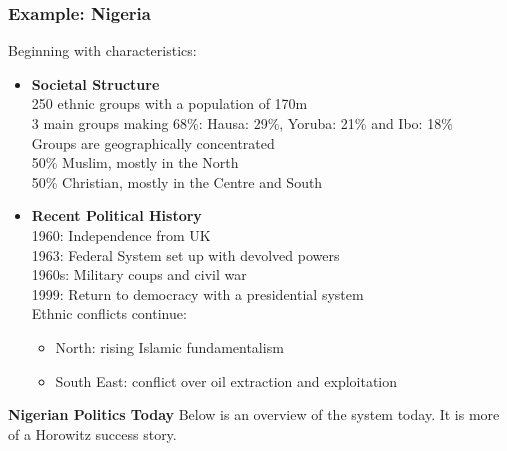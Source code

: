 \documentclass[12pt, letterpaper]{article}
\begin{document}
\subsubsection{Example: Nigeria}
Beginning with characteristics:
\begin{itemize}
	\item \textbf{Societal Structure}\\
		250 ethnic groups with a population of 170m\\
		3 main groups making 68\%: Hausa: 29\%, Yoruba: 21\% and Ibo: 18\%\\
		Groups are geographically concentrated\\
		50\% Muslim, mostly in the North\\
		50\% Christian, mostly in the Centre and South
	\item \textbf{Recent Political History}\\
		1960: Independence from UK\\
		1963: Federal System set up with devolved powers\\
		1960s: Military coups and civil war\\
		1999: Return to democracy with a presidential system\\
		Ethnic conflicts continue:
		\begin{itemize}
			\item North: rising Islamic fundamentalism
			\item South East: conflict over oil extraction and exploitation
		\end{itemize}
\end{itemize}
\textbf{Nigerian Politics Today}
Below is an overview of the system today. It is more of a Horowitz success story.
\end{document}
